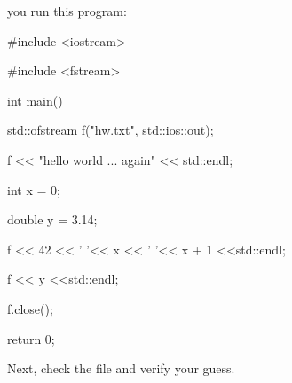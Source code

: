 you run this program:



\begin{console}

#include <iostream>

#include <fstream>



int main()

{   

    std::ofstream f("hw.txt", std::ios::out);

    f << "hello world ... again" << std::endl;

    int x = 0;

    double y = 3.14;

    f << 42 << ' '<< x << ' '<< x + 1 <<std::endl;

    f << y <<std::endl;

    f.close();



    return 0;

}

\end{console}



Next, check the file and verify your guess.


